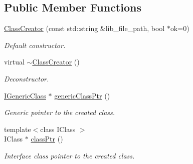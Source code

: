 \subsection*{Public Member Functions}
\begin{DoxyCompactItemize}
\item 
\hyperlink{classow__plugin__loader_1_1ClassCreator_a49195ecb27909a49b206d1eb6a36d90e}{Class\+Creator} (const std\+::string \&lib\+\_\+file\+\_\+path, bool $\ast$ok=0)
\begin{DoxyCompactList}\small\item\em Default constructor. \end{DoxyCompactList}\item 
virtual \hyperlink{classow__plugin__loader_1_1ClassCreator_a0020c21b86a1acaf0824a07139e6ef82}{$\sim$\+Class\+Creator} ()\hypertarget{classow__plugin__loader_1_1ClassCreator_a0020c21b86a1acaf0824a07139e6ef82}{}\label{classow__plugin__loader_1_1ClassCreator_a0020c21b86a1acaf0824a07139e6ef82}

\begin{DoxyCompactList}\small\item\em Deconstructor. \end{DoxyCompactList}\item 
\hyperlink{classow__core_1_1IGenericClass}{I\+Generic\+Class} $\ast$ \hyperlink{classow__plugin__loader_1_1ClassCreator_a69208f3b46de111a3a3820a8c2bb726a}{generic\+Class\+Ptr} ()
\begin{DoxyCompactList}\small\item\em Generic pointer to the created class. \end{DoxyCompactList}\item 
{\footnotesize template$<$class I\+Class $>$ }\\I\+Class $\ast$ \hyperlink{classow__plugin__loader_1_1ClassCreator_a135ab5f75eb0d1538d02eee8c3f1278e}{class\+Ptr} ()
\begin{DoxyCompactList}\small\item\em Interface class pointer to the created class. \end{DoxyCompactList}\end{DoxyCompactItemize}
